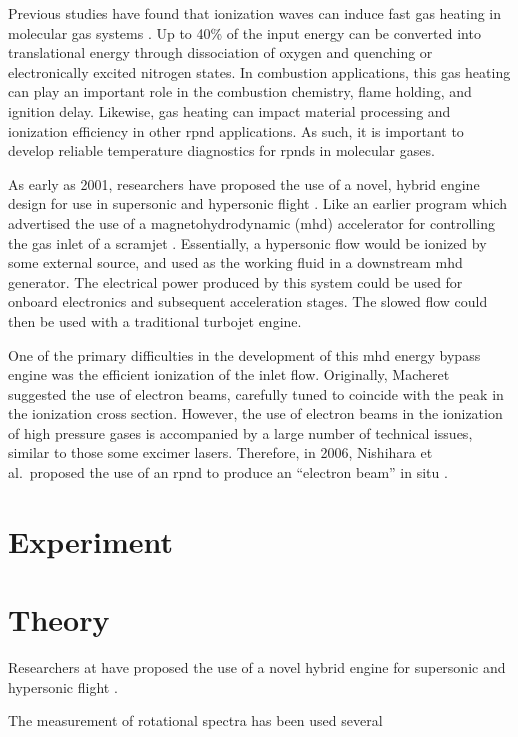Previous studies have found that ionization waves can induce fast gas heating in
molecular gas systems \cite{Popov2011}. Up to 40\% of the input energy can be
converted into translational energy through dissociation of oxygen and quenching
or electronically excited nitrogen states. In combustion applications, this gas
heating can play an important role in the combustion chemistry, flame holding,
and ignition delay. Likewise, gas heating can impact material processing and
ionization efficiency in other \acs{rpnd} applications. As such, it is important
to develop reliable temperature diagnostics for \acs{rpnd}s in molecular gases.

As early as 2001, researchers have proposed the use of a novel, hybrid engine
design for use in supersonic and hypersonic flight \cite{Macheret2001}. Like an
earlier program which advertised the use of a magnetohydrodynamic (\acs{mhd})
accelerator for controlling the gas inlet of a scramjet \cite{Gurijanov1996}.
Essentially, a hypersonic flow would be ionized by some external source, and
used as the working fluid in a downstream \acs{mhd} generator. The electrical
power produced by this system could be used for onboard electronics and
subsequent acceleration stages. The slowed flow could then be used with a
traditional turbojet engine.

One of the primary difficulties in the development of this \acs{mhd} energy
bypass engine was the efficient ionization of the inlet flow. Originally,
Macheret suggested the use of electron beams, carefully tuned to coincide with
the peak in the ionization cross section. However, the use of electron beams in
the ionization of high pressure gases is accompanied by a large number of
technical issues, similar to those some excimer lasers. Therefore, in 2006,
Nishihara et al.\ proposed the use of an \acs{rpnd} to produce an ``electron
beam'' in situ \cite{Nishihara2006}.



\section{Experiment}


\section{Theory}



Researchers at have proposed the use of a novel hybrid engine for supersonic and
hypersonic flight \cite{}.

The measurement of rotational spectra has been used several
